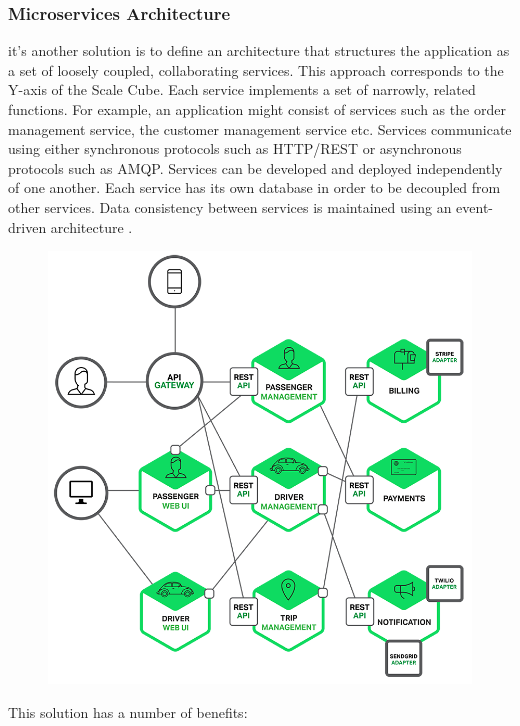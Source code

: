 \subsubsection{Microservices Architecture}
\label{subsec:subsec01}
it's another solution is to define an architecture that structures the application as a set of loosely coupled, collaborating services. 
This approach corresponds to the Y-axis of the Scale Cube. 
Each service implements a set of narrowly, related functions. For example, an application might 
consist of services such as the order management service, the customer management service etc.
Services communicate using either synchronous protocols such 
as HTTP/REST or asynchronous protocols such as AMQP. Services can be developed and deployed independently
 of one another. 
Each service has its own database in order to be decoupled from other services. Data consistency between services is maintained using 
an event-driven architecture .
\begin{figure}[h!]
	\centering
	\includegraphics[height=0.4\textheight]{fig01/microservices}
	\label{fig:FilialesEtClients}
\end{figure}

This solution has a number of benefits:

